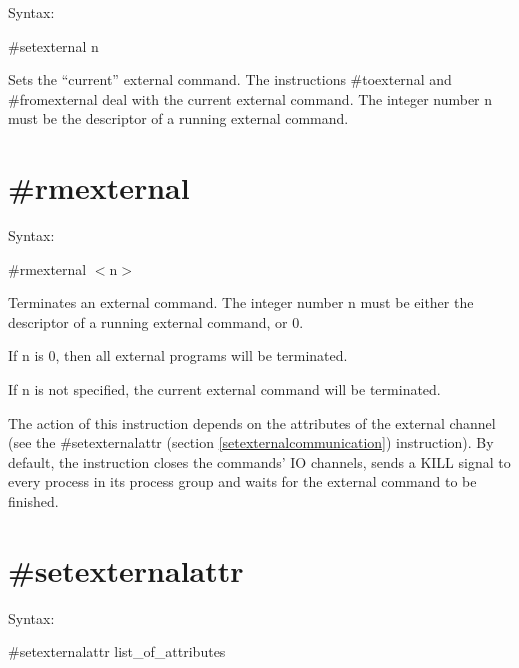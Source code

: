 \noindent Syntax:

\#setexternal n

\noindent Sets the ``current'' external command. The 
instructions \#toexternal and 
\#fromexternal deal with the current external 
command.  The integer number n must be the descriptor of a running external 
command.


\section{\#rmexternal}
\label{rmexternalcommunication}

\noindent Syntax:

\#rmexternal $<$n$>$

\noindent Terminates an external command. The integer 
number n must be either the descriptor of a running external command, or 0.

If n is 0, then all external programs will be terminated.

If n is not specified, the current external command will be terminated.

The action of this instruction depends on the attributes of the external 
channel (see the \#setexternalattr (section 
\ref{setexternalcommunication}) instruction). By default, the instruction 
closes the commands' IO channels, sends a KILL signal to 
every process in its process group and waits for the external command to be 
finished.


\section{\#setexternalattr}
\label{setexternalattrcommunication}

\noindent Syntax:

\#setexternalattr list\_of\_attributes

